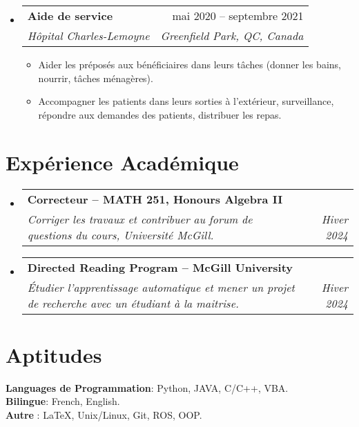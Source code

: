 \documentclass[letterpaper,11pt]{article}
\makeatletter
\newcommand{\resumeItem}[1]{
  \item{
    {#1 \vspace{-3pt}}
  }
}
\newcommand{\resumeSubheading}[4]{
  \vspace{-2pt}\item
    \begin{tabular*}{0.97\textwidth}[t]{l@{\extracolsep{\fill}}r}
      \textbf{#1} & #2 \\
      \textit{\small #3} & \textit{\small #4} \\
    \end{tabular*}\vspace{-10pt}
}
\newcommand{\resumeSubHeadingListStart}{\begin{itemize}[leftmargin=0.15in, label={}]}
\newcommand{\resumeSubHeadingListEnd}{\end{itemize}}
\newcommand{\resumeItemListStart}{\begin{itemize}}
\newcommand{\resumeItemListEnd}{\end{itemize}\vspace{-2pt}}
\makeatother
\begin{document}
\resumeSubHeadingListStart
    \resumeSubheading
      {Aide de service}{mai 2020 -- septembre 2021 }
      {Hôpital Charles-Lemoyne}{Greenfield Park, QC, Canada}
      \resumeItemListStart
        \small\resumeItem{Aider les préposés aux bénéficiaires dans leurs tâches (donner les bains, nourrir, tâches ménagères).}
        \resumeItem{Accompagner les patients dans leurs sorties à l’extérieur, surveillance, répondre aux demandes des patients, distribuer les repas.}
        \resumeItemListEnd
\resumeSubHeadingListEnd



\section{Expérience Académique} 
\resumeSubHeadingListStart
    \resumeSubheading
    {Correcteur -- MATH 251, Honours Algebra II}{}
    {Corriger les travaux et contribuer au forum de questions du cours, Université McGill.}{Hiver 2024} 
    \resumeSubheading
    {Directed Reading Program -- McGill University}{}
    {Étudier l'apprentissage automatique et mener un projet de recherche avec un étudiant à la maitrise.}{Hiver 2024}
\resumeSubHeadingListEnd

\section{Aptitudes}
\begin{itemize}[leftmargin=0.15in, label={}]
    \normalsize{\item{
     \textbf{Languages de Programmation}{: Python, JAVA, C/C++, VBA.}\\
     \textbf{Bilingue}{: French, English.}\\
     \textbf{Autre }{: \LaTeX, Unix/Linux, Git, ROS, OOP.}}}
 \end{itemize}
\end{document}
